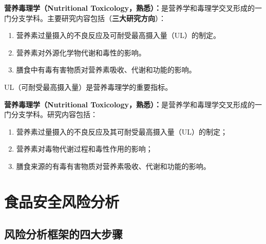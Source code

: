 \begin{defbox}
\textbf{营养毒理学（Nutritional Toxicology，熟悉）：}是营养学和毒理学交叉形成的一门分支学科。主要研究内容包括（\textbf{三大研究方向}）：
\begin{enumerate}[leftmargin=*]
    \item 营养素过量摄入的不良反应及可耐受最高摄入量（UL）的制定。
    \item 营养素对外源化学物代谢和毒性的影响。
    \item 膳食中有毒有害物质对营养素吸收、代谢和功能的影响。
\end{enumerate}

UL（可耐受最高摄入量）是营养毒理学的重要指标。
\end{defbox}

\begin{tipbox}
\textbf{营养毒理学（Nutritional Toxicology，熟悉）：}是营养学和毒理学交叉形成的一门分支学科。研究内容包括：
\begin{enumerate}[leftmargin=*]
    \item 营养素过量摄入的不良反应及其可耐受最高摄入量（UL）的制定；
    \item 营养素对毒物代谢过程和毒性作用的影响；
    \item 膳食来源的有毒有害物质对营养素吸收、代谢和功能的影响。
\end{enumerate}
\end{tipbox}

\section{食品安全风险分析}

\subsection{风险分析框架的四大步骤}


